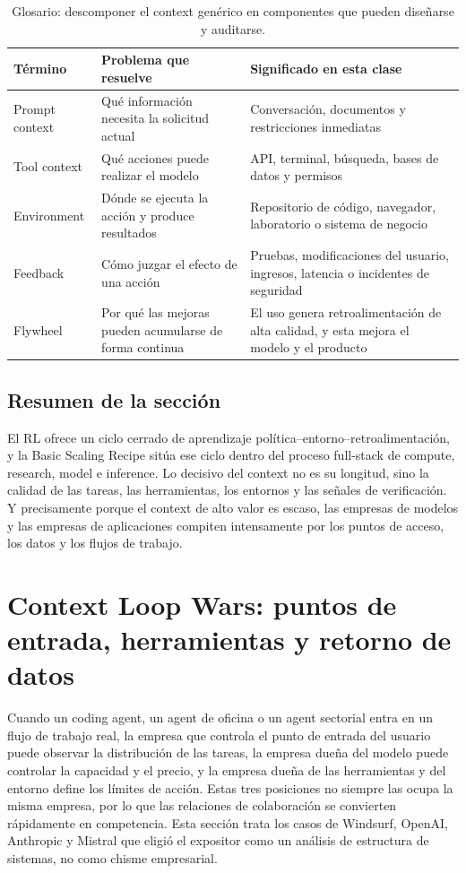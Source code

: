 \documentclass[a4paper]{article}
\begin{document}
\begin{table}[H]
\centering
\begin{tabular}{L{0.18\textwidth}L{0.32\textwidth}L{0.4\textwidth}}
\toprule
Término & Problema que resuelve & Significado en esta clase \\
\midrule
Prompt context & Qué información necesita la solicitud actual & Conversación, documentos y restricciones inmediatas \\
Tool context & Qué acciones puede realizar el modelo & API, terminal, búsqueda, bases de datos y permisos \\
Environment & Dónde se ejecuta la acción y produce resultados & Repositorio de código, navegador, laboratorio o sistema de negocio \\
Feedback & Cómo juzgar el efecto de una acción & Pruebas, modificaciones del usuario, ingresos, latencia o incidentes de seguridad \\
Flywheel & Por qué las mejoras pueden acumularse de forma continua & El uso genera retroalimentación de alta calidad, y esta mejora el modelo y el producto \\
\bottomrule
\end{tabular}
\caption{Glosario: descomponer el context genérico en componentes que pueden diseñarse y auditarse.}
\end{table}

\subsection{Resumen de la sección}

El RL ofrece un ciclo cerrado de aprendizaje política–entorno–retroalimentación, y la Basic Scaling Recipe sitúa ese ciclo dentro del proceso full-stack de compute, research, model e inference. Lo decisivo del context no es su longitud, sino la calidad de las tareas, las herramientas, los entornos y las señales de verificación. Y precisamente porque el context de alto valor es escaso, las empresas de modelos y las empresas de aplicaciones compiten intensamente por los puntos de acceso, los datos y los flujos de trabajo.
\section{Context Loop Wars: puntos de entrada, herramientas y retorno de datos}

Cuando un coding agent, un agent de oficina o un agent sectorial entra en un flujo de trabajo real, la empresa que controla el punto de entrada del usuario puede observar la distribución de las tareas, la empresa dueña del modelo puede controlar la capacidad y el precio, y la empresa dueña de las herramientas y del entorno define los límites de acción. Estas tres posiciones no siempre las ocupa la misma empresa, por lo que las relaciones de colaboración se convierten rápidamente en competencia. Esta sección trata los casos de Windsurf, OpenAI, Anthropic y Mistral que eligió el expositor como un análisis de estructura de sistemas, no como chisme empresarial.
\end{document}
